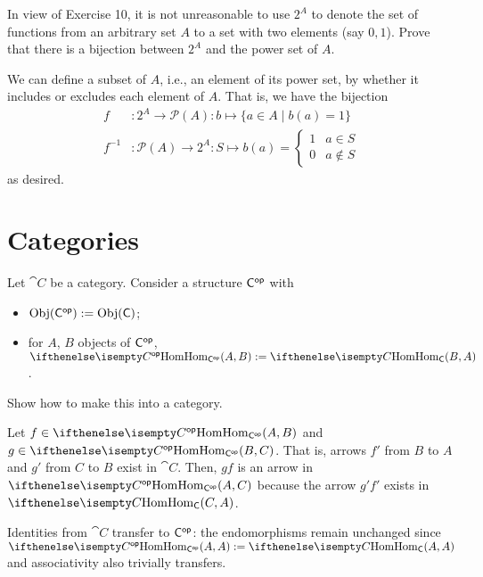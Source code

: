 \documentclass[notes,tikz]{agony}
\begin{document}
\begin{xca}
  In view of Exercise 10, it is not unreasonable to use $2^A$
  to denote the set of functions from an arbitrary set $A$ to a set with two elements (say ${0, 1}$).
  Prove that there is a bijection between $2^A$ and the power set of $A$.
\end{xca}
\begin{prf}
  We can define a subset of $A$, i.e., an element of its power set,
  by whether it includes or excludes each element of $A$.
  That is, we have the bijection
  \begin{align*}
    f      & : 2^A \to \mathcal{P}(A) : b \mapsto \{ a \in A \mid b(a) = 1 \} \\
    f^{-1} & : \mathcal{P}(A) \to 2^A : S \mapsto b(a) = \begin{cases}
                                                           1 & a \in S     \\
                                                           0 & a \not\in S
                                                         \end{cases}
  \end{align*}
  as desired.
\end{prf}

\section{Categories}

\begin{xca}
  Let $\cat{C}$ be a category. Consider a structure $\mathsf{C^{\mathsf{op}}}$ with
  \begin{itemize}[nosep]
    \item $\operatorname{Obj}(\mathsf{C^{\mathsf{op}}}) := \operatorname{Obj}(\mathsf{C})$;
    \item for $A$, $B$ objects of $\mathsf{C^{\mathsf{op}}}$, $\Hom[C\op](A,B) := \Hom[C](B,A)$.
  \end{itemize}
  Show how to make this into a category.
\end{xca}
\begin{sol}
  Let $f \in \Hom[C\op](A,B)$ and $g \in \Hom[C\op](B,C)$.
  That is, arrows $f'$ from $B$ to $A$ and $g'$ from $C$ to $B$ exist in $\cat{C}$.
  Then, $gf$ is an arrow in $\Hom[C\op](A,C)$
  because the arrow $g'f'$ exists in $\Hom[C](C,A)$.

  Identities from $\cat{C}$ transfer to $\mathsf{C^{\mathsf{op}}}$:
  the endomorphisms remain unchanged since $\Hom[C\op](A,A) := \Hom[C](A,A)$
  and associativity also trivially transfers.
\end{sol}
\end{document}
